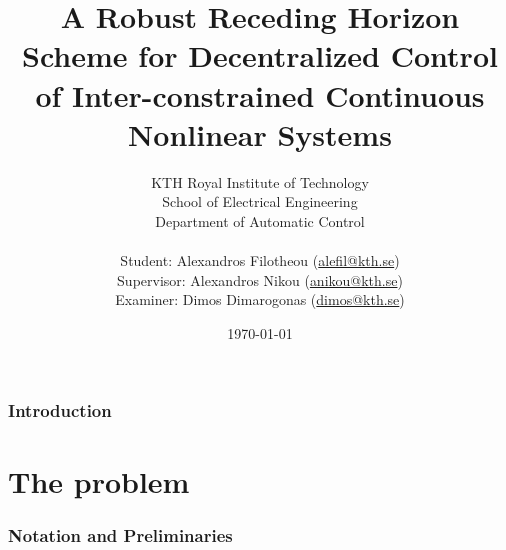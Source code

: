 \documentclass[a4paper,10pt,twoside]{article}
\title{\textbf{
A Robust Receding Horizon Scheme for Decentralized Control of Inter-constrained
Continuous Nonlinear Systems}}
\author{KTH Royal Institute of Technology \\
  School of Electrical Engineering \\
  Department of Automatic Control \\ \\
Student: Alexandros Filotheou (\href{mailto: alefil@kth.se}{alefil@kth.se}) \\
Supervisor: Alexandros Nikou (\href{mailto: anikou@kth.se}{anikou@kth.se}) \\
Examiner: Dimos Dimarogonas (\href{mailto: dimos@kth.se}{dimos@kth.se}) \\}
\date{\today}
\begin{document}
\maketitle


\cleardoublepage
\tableofcontents
\cleardoublepage


\section{Introduction}

  
  \cleardoublepage

\part{The problem}
\cleardoublepage

  \section{Notation and Preliminaries}
    \label{sec:notation_reliminaries}

    
    
    
    \cleardoublepage


\end{document}
